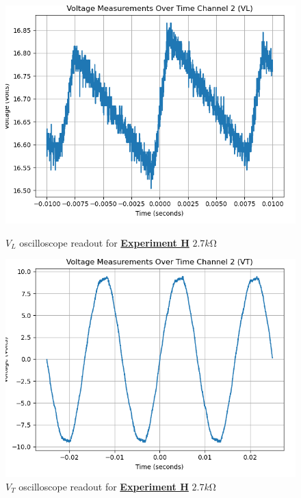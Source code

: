 \documentclass[
	letterpaper
	12pt
]{template}
\newcommand{\bref}[2]{\textbf{\hyperref[#1]{#2}}}
\begin{document}
\begin{figure}[H]\label{data::H5}
	\centering
	\begin{minipage}[c]{0.45\textwidth}
		\centering
		\includegraphics[width=\textwidth]{figures/H/9--ch2.png}
	    \caption{$V_{L}$ oscilloscope readout for \bref{exp::H}{Experiment H} $2.7\unit{k\ohm}$ }
	\end{minipage}
	\hfill
	\begin{minipage}[c]{0.45\textwidth}
		\centering
		\includegraphics[width=\textwidth]{figures/H/10--ch2.png}
	    \caption{$V_{T}$ oscilloscope readout for \bref{exp::H}{Experiment H} $2.7\unit{k\ohm}$ }
	\end{minipage}
\end{figure}
\end{document}
